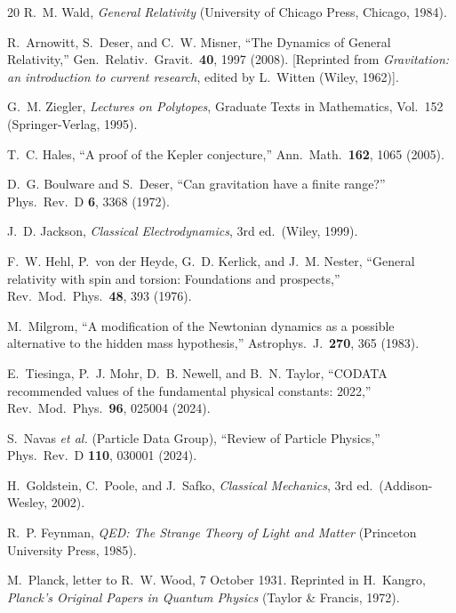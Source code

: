 \documentclass[aps,prd,preprint,superscriptaddress,showpacs,preprintnumbers,amsmath,amssymb,nofootinbib]{revtex4-2}
\begin{document}
\begin{thebibliography}{20}
R.~M. Wald, \emph{General Relativity} (University of Chicago Press, Chicago, 1984).

R.~Arnowitt, S.~Deser, and C.~W. Misner, ``The Dynamics of General Relativity,'' Gen.\ Relativ.\ Gravit.\ \textbf{40}, 1997 (2008). [Reprinted from \emph{Gravitation: an introduction to current research}, edited by L.~Witten (Wiley, 1962)].

G.~M. Ziegler, \emph{Lectures on Polytopes}, Graduate Texts in Mathematics, Vol.~152 (Springer-Verlag, 1995).

T.~C. Hales, ``A proof of the Kepler conjecture,'' Ann.\ Math.\ \textbf{162}, 1065 (2005).

D.~G. Boulware and S.~Deser, ``Can gravitation have a finite range?'' Phys.\ Rev.\ D \textbf{6}, 3368 (1972).

J.~D. Jackson, \emph{Classical Electrodynamics}, 3rd ed.\ (Wiley, 1999).

F.~W. Hehl, P.~von der Heyde, G.~D. Kerlick, and J.~M. Nester, ``General relativity with spin and torsion: Foundations and prospects,'' Rev.\ Mod.\ Phys.\ \textbf{48}, 393 (1976).

M.~Milgrom, ``A modification of the Newtonian dynamics as a possible alternative to the hidden mass hypothesis,'' Astrophys.\ J.\ \textbf{270}, 365 (1983).

E.~Tiesinga, P.~J. Mohr, D.~B. Newell, and B.~N. Taylor, ``CODATA recommended values of the fundamental physical constants: 2022,'' Rev.\ Mod.\ Phys.\ \textbf{96}, 025004 (2024).

S.~Navas \textit{et al.} (Particle Data Group), ``Review of Particle Physics,'' Phys.\ Rev.\ D \textbf{110}, 030001 (2024).

H.~Goldstein, C.~Poole, and J.~Safko, \emph{Classical Mechanics}, 3rd ed.\ (Addison-Wesley, 2002).

R.~P. Feynman, \emph{QED: The Strange Theory of Light and Matter} (Princeton University Press, 1985).

M.~Planck, letter to R.~W. Wood, 7 October 1931. Reprinted in H.~Kangro, \emph{Planck's Original Papers in Quantum Physics} (Taylor \& Francis, 1972).

\end{thebibliography}
\end{document}
